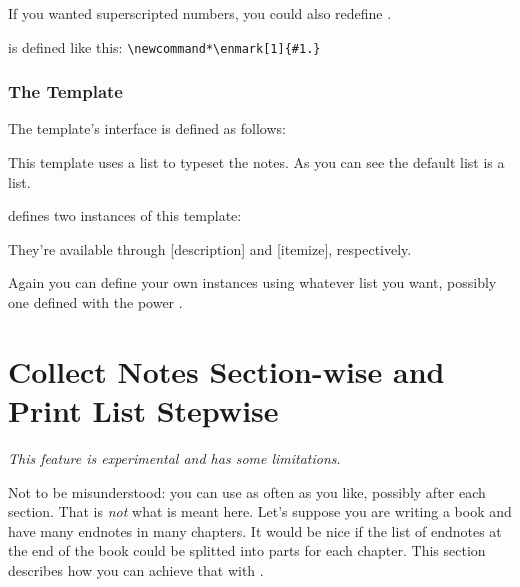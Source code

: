 \documentclass[toc=bib,toc=index]{cnpkgdoc}
\begin{document}
If you wanted superscripted numbers, you could also redefine . 
\begin{beschreibung}
  is defined like this: \verb=\newcommand*\enmark[1]{#1.}=
\end{beschreibung}

\subsubsection{The  Template}
The  template's interface is defined as follows:
This template uses a list to typeset the notes. As you can see the default list
is a  list.

\enotez defines two instances of this template:
\begin{beispiel}
\end{beispiel}
They're available through [description] and
[itemize], respectively.

Again you can define your own instances using whatever list you want, possibly
one defined with the power .

\section{Collect Notes Section-wise and Print List Stepwise}
\emph{This feature is experimental and has some limitations}.

Not to be misunderstood: you can use  as often as you like,
possibly after each section. That is \emph{not} what is meant here. Let's
suppose you are writing a book and have many endnotes in many chapters. It
would be nice if the list of endnotes at the end of the book could be splitted
into parts for each chapter. This section describes how you can achieve that with
\enotez.
\end{document}
